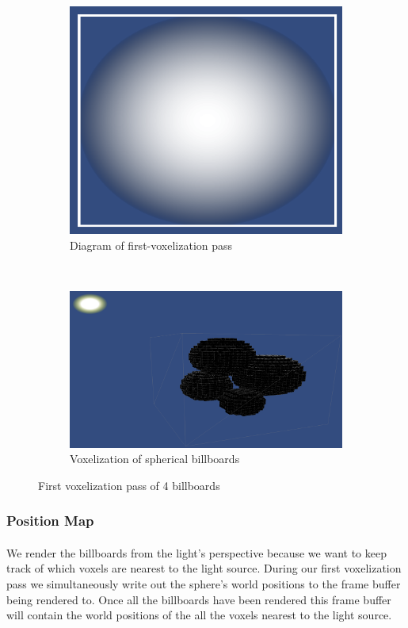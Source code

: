 \begin{figure}[t]
\begin{subfigure}[t]{0.48\textwidth}
	\includegraphics[width=\textwidth]{../res/spherebillboard.png}
	\caption{Diagram of first-voxelization pass}
	\end{subfigure}
	~
	\begin{subfigure}[t]{0.48\textwidth}
	\includegraphics[width=\textwidth]{../res/voxelize1.png}
	\caption{Voxelization of spherical billboards}
	\end{subfigure}
\caption{First voxelization pass of 4 billboards}
\end{figure}

\newpage
\subsubsection{Position Map}\paragraph{}
We render the billboards from the light's perspective because we want to keep track of which voxels are nearest to the light source. 
During our first voxelization pass we simultaneously write out the sphere's world positions to the frame buffer being rendered to. Once all the billboards have been rendered this frame buffer will contain the world positions of the all the voxels nearest to the light source. 

